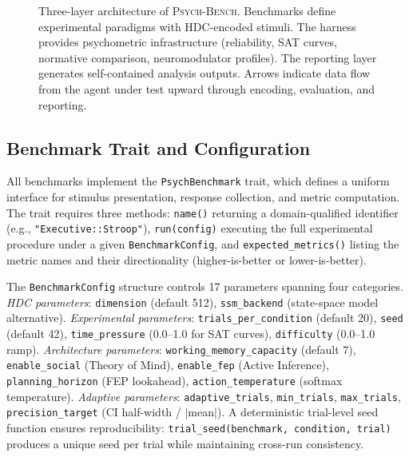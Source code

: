 \documentclass[11pt,letterpaper]{article}
\newcommand{\bind}{\otimes}
\newcommand{\symthaea}{\textsc{Symthaea}}
\newcommand{\psychbench}{\textsc{Psych-Bench}}
\begin{document}
\begin{figure}[t]
\caption{Three-layer architecture of \psychbench{}. Benchmarks define experimental paradigms with HDC-encoded stimuli. The harness provides psychometric infrastructure (reliability, SAT curves, normative comparison, neuromodulator profiles). The reporting layer generates self-contained analysis outputs. Arrows indicate data flow from the agent under test upward through encoding, evaluation, and reporting.}
\label{fig:architecture}
\end{figure}

\subsection{Benchmark Trait and Configuration}

All benchmarks implement the \texttt{PsychBenchmark} trait, which defines a uniform interface for stimulus presentation, response collection, and metric computation. The trait requires three methods: \texttt{name()} returning a domain-qualified identifier (e.g., \texttt{"Executive::Stroop"}), \texttt{run(config)} executing the full experimental procedure under a given \texttt{BenchmarkConfig}, and \texttt{expected\_metrics()} listing the metric names and their directionality (higher-is-better or lower-is-better).

The \texttt{BenchmarkConfig} structure controls 17 parameters spanning four categories. \emph{HDC parameters}: \texttt{dimension} (default 512), \texttt{ssm\_backend} (state-space model alternative). \emph{Experimental parameters}: \texttt{trials\_per\_condition} (default 20), \texttt{seed} (default 42), \texttt{time\_pressure} (0.0--1.0 for SAT curves), \texttt{difficulty} (0.0--1.0 ramp). \emph{Architecture parameters}: \texttt{working\_memory\_capacity} (default 7), \texttt{enable\_social} (Theory of Mind), \texttt{enable\_fep} (Active Inference), \texttt{planning\_horizon} (FEP lookahead), \texttt{action\_temperature} (softmax temperature). \emph{Adaptive parameters}: \texttt{adaptive\_trials}, \texttt{min\_trials}, \texttt{max\_trials}, \texttt{precision\_target} (CI half-width / $|$mean$|$). A deterministic trial-level seed function ensures reproducibility: \texttt{trial\_seed(benchmark, condition, trial)} produces a unique seed per trial while maintaining cross-run consistency.
\end{document}
